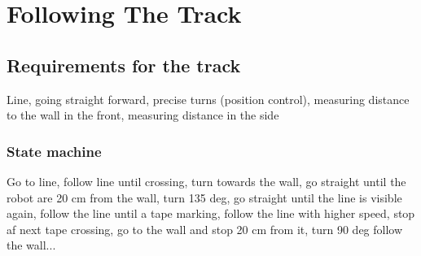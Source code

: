 \chapter{Following The Track}
\label{chap:track}

\section{Requirements for the track}
Line, going straight forward, precise turns (position control), measuring distance to the wall in the front, measuring distance in the side

\subsection{State machine}
Go to line, follow line until crossing, turn towards the wall, go straight until the robot are 20 cm from the wall, turn 135 deg, go straight until the line is visible again, follow the line until a tape marking, follow the line with higher speed, stop af next tape crossing, go to the wall and stop 20 cm from it, turn 90 deg follow the wall... 

